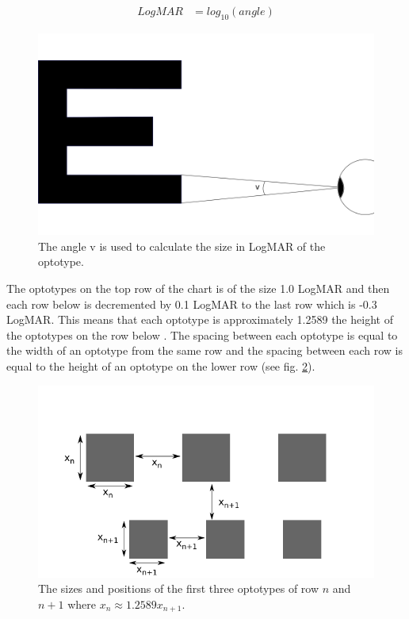 \documentclass[12pt,a4paper,notitlepage]{report}
\begin{document}
\begin{equation}
	\begin{split}
  		LogMAR & = log_{10}(angle)
  	\end{split}
  	\label{eq:logmar}
\end{equation}

\begin{figure}[h]
\centering
\includegraphics[width=120mm]{images/logmar_calculation.png}
\caption{The angle v is used to calculate the size in LogMAR of the optotype.\label{fig:logmar_calculation}}
\end{figure} 

The optotypes on the top row of the chart is of the size 1.0 LogMAR and then each row below is decremented by 0.1 LogMAR to the last row which is -0.3 LogMAR. This means that each optotype is approximately 1.2589 the height of the optotypes on the row below \cite{Ferris}. The spacing between each optotype is equal to the width of an optotype from the same row and the spacing between each row is equal to the height of an optotype on the lower row (see fig. \ref{fig:etdrs_chart_sizes}).

\begin{figure}[h]
\centering
\includegraphics[width=120mm]{images/etdrs_chart_sizes.png}
\caption{The sizes and positions of the first three optotypes of row $n$ and $n+1$ where $x_n \approx 1.2589 x_{n+1}$. \label{fig:etdrs_chart_sizes}}
\end{figure} 
\end{document}
